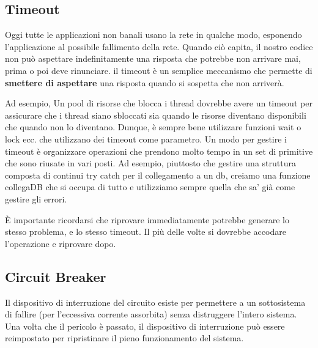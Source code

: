 \subsection{Timeout}
Oggi tutte le applicazioni non banali usano la rete in qualche modo, esponendo l’applicazione al possibile fallimento della rete. Quando ciò capita, il nostro codice non può aspettare indefinitamente una risposta che potrebbe non arrivare mai, prima o poi deve rinunciare. il timeout è un semplice meccanismo che permette di \textbf{smettere di aspettare} una risposta quando si sospetta che non arriverà. 

Ad esempio, Un pool di risorse che blocca i thread dovrebbe avere un timeout per assicurare che i thread siano sbloccati sia quando le risorse diventano disponibili che quando non lo diventano. Dunque, è sempre bene utilizzare funzioni wait o lock ecc. che utilizzano dei timeout come parametro. Un modo per gestire i timeout è organizzare operazioni che prendono molto tempo in un set di primitive che sono riusate in vari posti. Ad esempio, piuttosto che gestire una struttura composta di continui try catch per il collegamento a un db, creiamo una funzione collegaDB che si occupa di tutto e utilizziamo sempre quella che sa' già come gestire gli errori.

È importante ricordarsi che riprovare immediatamente potrebbe generare lo stesso problema, e lo stesso timeout. Il più delle volte si dovrebbe accodare l’operazione e riprovare dopo. 

\subsection{Circuit Breaker}
Il dispositivo di interruzione del circuito esiste per permettere a un sottosistema di fallire (per l’eccessiva corrente assorbita) senza distruggere l’intero sistema. Una volta che il pericolo è passato, il dispositivo di interruzione può essere reimpostato per ripristinare il pieno funzionamento del sistema.

